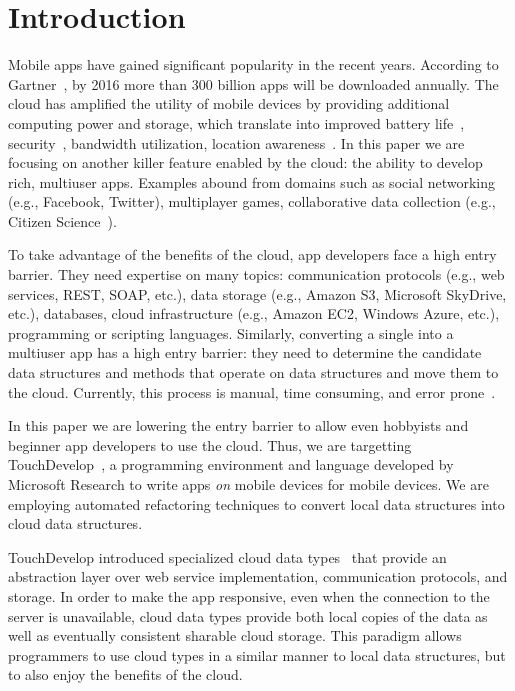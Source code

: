 \documentclass{sigplanconf}
\begin{document}
\section{Introduction}

Mobile apps have gained significant popularity in the recent years. According to Gartner~\cite{Gartner}, by 2016 more than 300 billion apps will be downloaded annually. The cloud has amplified the utility of mobile devices by providing additional computing power and storage, which translate into improved battery life~\cite{TODO}, security~\cite{TODO}, bandwidth utilization, location awareness~\cite{OOPSLA13:fromMicrosoft}. In this paper we are focusing on another killer feature enabled by the cloud: the ability to develop rich, multiuser apps. Examples abound from domains such as social networking (e.g., Facebook, Twitter), multiplayer games, collaborative data collection (e.g., Citizen Science~\cite{TODO:natureMagazine}). 

To take advantage of the benefits of the cloud, app developers face a high entry barrier. They need expertise on many topics: communication protocols (e.g., web services, REST, SOAP, etc.), data storage (e.g., Amazon S3, Microsoft SkyDrive, etc.), databases, cloud infrastructure (e.g., Amazon EC2, Windows Azure, etc.),  programming or scripting languages. Similarly, converting a single into a multiuser app has a high entry barrier: they need to determine the candidate data structures and methods that operate on data structures and move them to the cloud. Currently, this process is manual, time consuming, and error prone~\cite{khan2013survey}.

In this paper we are lowering the entry barrier to allow even hobbyists and beginner app developers to use the cloud. Thus, we are targetting TouchDevelop~\cite{Tillmann2011TPC20482372048245}, a programming environment and language developed by Microsoft Research to write apps \emph{on} mobile devices for mobile devices. We are employing automated refactoring techniques to convert local data structures into cloud data structures.

TouchDevelop introduced specialized cloud data types~\cite{burckhardt2012cloud} that provide an abstraction layer over web service implementation, communication protocols, and storage.  In order to make the app responsive, even when the connection to the server is unavailable, cloud data types provide both local copies of the data as well as eventually consistent sharable cloud storage. This paradigm allows programmers to use cloud types in a similar manner to local data structures, but to also enjoy the benefits of the cloud.
\end{document}
